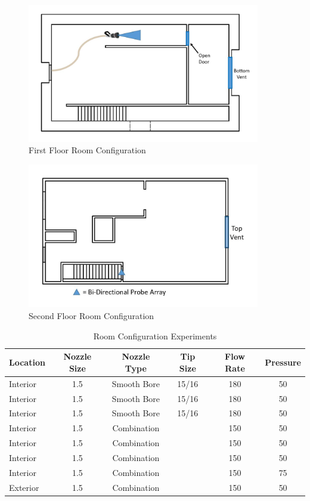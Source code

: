 \documentclass{article}
\begin{document}
\begin{figure}[!ht]
	\centering
	\includegraphics[width=4in]{Figures/Air_Entrainment/Measurement_Location_Room_Configuration_Bottom.jpg}
	\caption{First Floor Room Configuration}
	\label{fig:First_Floor_Room_Configuration}
\end{figure}

\begin{figure}[!ht]
	\centering
	\includegraphics[width=4in]{Figures/Air_Entrainment/Measurement_Location_VentConfig_Top.jpg}
	\caption{Second Floor Room Configuration}
	\label{fig:Second_Floor_Room_Configuration}
\end{figure}

\begin{table}[]
\centering
\begin{tabular}{|lccccc|}
\hline
\multicolumn{1}{|c|}{\textbf{Location}} & \multicolumn{1}{c|}{\textbf{Nozzle Size}} & \multicolumn{1}{c|}{\textbf{Nozzle Type}} & \multicolumn{1}{c|}{\textbf{Tip Size}} & \multicolumn{1}{c|}{\textbf{Flow Rate}} & \textbf{Pressure} \\ \hline
Interior & 1.5 & Smooth Bore & 15/16 & 180 & 50 \\
Interior & 1.5 & Smooth Bore & 15/16 & 180 & 50 \\
Interior & 1.5 & Smooth Bore & 15/16 & 180 & 50 \\
Interior & 1.5 & Combination &  & 150 & 50 \\
Interior & 1.5 & Combination &  & 150 & 50 \\
Interior & 1.5 & Combination &  & 150 & 50 \\
Interior & 1.5 & Combination &  & 150 & 75 \\
Exterior & 1.5 & Combination &  & 150 & 50 \\ \hline
\end{tabular}
\caption{Room Configuration Experiments}
\label{Room_Configuration_Experiments}
\end{table}
\end{document}
